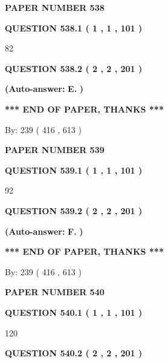\documentclass[12pt]{article}
\begin{document}
   
\newpage 
\setcounter{page}{ 
   538001 } 
   
   
 {\textbf{ \Large{ PAPER NUMBER  538  }}}
   
   
   
   
  
  
{\textbf{\large{QUESTION
538.1 
 ( 1 , 1 , 101 )
}}}

82
  
  
{\textbf{\large{QUESTION
538.2 
 ( 2 , 2 , 201 )
}}}
 
 
{\textbf{(Auto-answer:}}
{\textbf{\large{
E.}}}
{\textbf{)}}
 
 
   
   
   
   
\vspace{1.0in} 
{\textbf{\large{ *** END OF PAPER, THANKS *** }}} 
   
   
\hspace{1.0in} By: 
 239 ( 416 ,  613 )
   
   
   
   
\newpage 
\setcounter{page}{ 
   539001 } 
   
   
 {\textbf{ \Large{ PAPER NUMBER  539  }}}
   
   
   
   
  
  
{\textbf{\large{QUESTION
539.1 
 ( 1 , 1 , 101 )
}}}

92
  
  
{\textbf{\large{QUESTION
539.2 
 ( 2 , 2 , 201 )
}}}
 
 
{\textbf{(Auto-answer:}}
{\textbf{\large{
F.}}}
{\textbf{)}}
 
 
   
   
   
   
\vspace{1.0in} 
{\textbf{\large{ *** END OF PAPER, THANKS *** }}} 
   
   
\hspace{1.0in} By: 
 239 ( 416 ,  613 )
   
   
   
   
\newpage 
\setcounter{page}{ 
   540001 } 
   
   
 {\textbf{ \Large{ PAPER NUMBER  540  }}}
   
   
   
   
  
  
{\textbf{\large{QUESTION
540.1 
 ( 1 , 1 , 101 )
}}}

120
  
  
{\textbf{\large{QUESTION
540.2 
 ( 2 , 2 , 201 )
}}}
 
\end{document}
